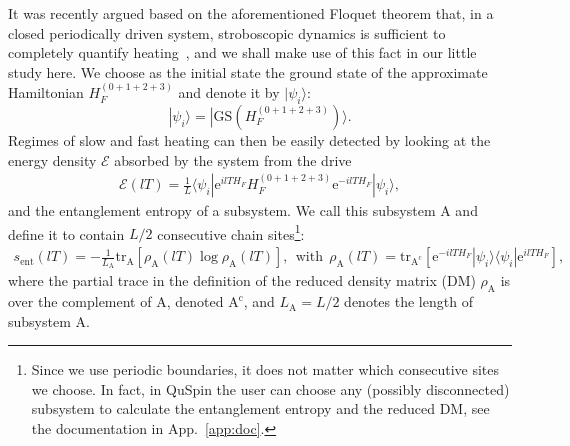 \documentclass{SciPost}
\newcommand\0{\scalebox{-1}[1]{0}}
\begin{document}
It was recently argued based on the aforementioned Floquet theorem that, in a closed periodically driven system, stroboscopic dynamics is sufficient to completely quantify heating~\cite{bukov_16}, and we shall make use of this fact in our little study here. We choose as the initial state the ground state of the approximate Hamiltonian $H_F^{(0+1+2+3)}$ and denote it by $|\psi_i\rangle$:
\begin{equation}
|\psi_i\rangle = |\mathrm{GS}(H_F^{(0+1+2+3)})\rangle.
\end{equation}
Regimes of slow and fast heating can then be easily detected by looking at the energy density $\mathcal{E}$ absorbed by the system from the drive
\begin{eqnarray}
\mathcal{E}(lT) = \frac{1}{L}\langle\psi_i|\mathrm e^{ilT H_F}H_F^{(0+1+2+3)}\mathrm e^{-ilT H_F}|\psi_i\rangle, 
\label{eq:Floquet_E}
\end{eqnarray}
and the entanglement entropy of a subsystem. We call this subsystem A and define it to contain $L/2$ consecutive chain sites\footnote{Since we use periodic boundaries, it does not matter which consecutive sites we choose. In fact, in QuSpin the user can choose any (possibly disconnected) subsystem to calculate the entanglement entropy and the reduced DM, see the documentation in App.~\ref{app:doc}.}:
\begin{eqnarray}
s_\mathrm{ent}(lT) = -\frac{1}{L_\mathrm{A}}\mathrm{tr}_\mathrm{A}\left[ \rho_\mathrm{A}(lT)\log\rho_\mathrm{A}(lT) \right], \ \ \mathrm{with}\ \ \rho_\mathrm{A}(lT) = \mathrm{tr}_\mathrm{A^c}\left[ \mathrm e^{-ilT H_F}|\psi_i\rangle\langle\psi_i|\mathrm e^{ilT H_F}\right],
\label{eq:Floquet_S}
\end{eqnarray}
where the partial trace in the definition of the reduced density matrix (DM) $\rho_\mathrm{A}$ is over the complement of A, denoted $\mathrm{A^c}$, and $L_\mathrm{A}=L/2$ denotes the length of subsystem A.
\end{document}
